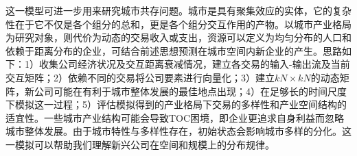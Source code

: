 这一模型可进一步用来研究城市共存问题。城市是具有聚集效应的实体，它的复杂性在于它不仅是各个组分的总和，更是各个组分交互作用的产物。以城市产业格局为研究对象，则代价为动态的交易收入或支出，资源可以定义为均匀分布的人口和依赖于距离分布的企业，可结合前述思想预测在城市空间内新企业的产生。思路如下：1）收集公司经济状况及交互距离衰减情况，建立各交易的输入-输出流及当前交互矩阵；2）依赖不同的交易将公司要素进行向量化；3）建立$kN\times kN$的动态矩阵，新公司可能在有利于城市整体发展的最佳地点出现；4）在足够长的时间尺度下模拟这一过程；5）评估模拟得到的产业格局下交易的多样性和产业空间结构的适宜性。一些城市产业结构可能会导致TOC困境，即企业更追求自身利益而忽略城市整体发展。由于城市特性与多样性存在，初始状态会影响城市多样的分化。这一模拟可以帮助我们理解新兴公司在空间和规模上的分布规律。




